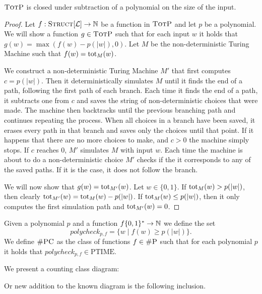 \begin{theo}
	$\textsc{TotP}$ is closed under subtraction of a polynomial on the size of the input.
\end{theo}
\begin{proof}
	Let $f:\textsc{Struct}[{\cal L}]\to\mathbb{N}$ be a function in $\textsc{TotP}$ and let $p$ be a polynomial. We will show a function $g\in\textsc{TotP}$ such that for each input $w$ it holds that $g(w) = \max(f(w) - p(\vert w \vert),0)$. Let $M$ be the non-deterministic Turing Machine such that $f(w) = \text{tot}_M(w)$. 
	
	We construct a non-deterministic Turing Machine $M'$ that first computes $c = p(\vert w \vert)$. Then it deterministically simulates $M$ until it finds the end of a path, following the first path of each branch. Each time it finds the end of a path, it subtracts one from $c$ and saves the string of non-deterministic choices that were made. The machine then backtracks until the previous branching path and continues repeating the process. When all choices in a branch have been saved, it erases every path in that branch and saves only the choices until that point. If it happens that there are no more choices to make, and $c > 0$ the machine simply stops. If $c$ reaches 0, $M'$ simulates $M$ with input $w$. Each time the machine is about to do a non-deterministic choice $M'$ checks if the it corresponds to any of the saved paths. If it is the case, it does not follow the branch.
	
	We will now show that $g(w) = \text{tot}_{M'}(w)$. Let $w\in\{0,1\}$. If $\text{tot}_{M}(w) > p(\vert w \vert)$, then clearly $\text{tot}_{M'}(w) = \text{tot}_{M}(w) - p(\vert w \vert)$. If $\text{tot}_{M}(w) \leq p(\vert w \vert)$, then it only computes the first simulation path and $\text{tot}_{M'}(w) = 0$.
\end{proof}

Given a polynomial $p$ and a function $f\{0,1\}^*\to\mathbb{N}$ we define the set
\[
	polycheck_{p,f} = \{w\mid f(w) \geq p(\vert w \vert) \}.
\]
We define $\textsc{\#PC}$ as the class of functions $f\in\textsc{\#P}$ such that for each polynomial $p$ it holds that $polycheck_{p,f}\in \text{PTIME}$.

We present a counting class diagram:



Or new addition to the known diagram is the following inclusion.

